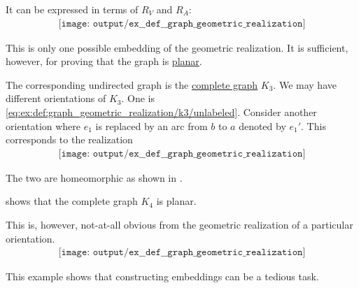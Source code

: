 \begin{example}
\begin{thmenum}
    It can be expressed in terms of \( R_V \) and \( R_A \):
    \begin{equation}\label{eq:ex:def:graph_geometric_realization/k3/unlabeled}
      \begin{aligned}
        \texttt{[image: output/ex\_\_def\_\_graph\_geometric\_realization]}
      \end{aligned}
    \end{equation}

    This is only one possible embedding of the geometric realization. It is sufficient, however, for proving that the graph is \hyperref[def:planar_graph]{planar}.

    The corresponding undirected graph is the \hyperref[def:complete_graph]{complete graph} \( K_3 \). We may have different orientations of \( K_3 \). One is \eqref{eq:ex:def:graph_geometric_realization/k3/unlabeled}. Consider another orientation where \( e_1 \) is replaced by an arc from \( b \) to \( a \) denoted by \( e_1' \). This corresponds to the realization
    \begin{equation}\label{eq:ex:def:graph_geometric_realization/k3/undirected_2}
      \begin{aligned}
        \texttt{[image: output/ex\_\_def\_\_graph\_geometric\_realization]}
      \end{aligned}
    \end{equation}

    The two are homeomorphic as shown in .

      shows that the complete graph \( K_4 \) is planar.

    This is, however, not-at-all obvious from the geometric realization of a particular orientation.
    \begin{equation}\label{eq:ex:def:graph_geometric_realization/k4/realization}
      \begin{aligned}
        \texttt{[image: output/ex\_\_def\_\_graph\_geometric\_realization]}
      \end{aligned}
    \end{equation}

    This example shows that constructing embeddings can be a tedious task.
  \end{thmenum}
\end{example}

